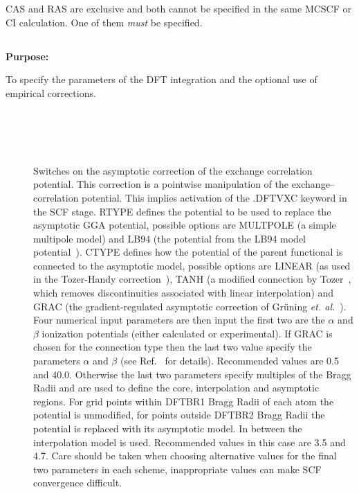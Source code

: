 \noindent
CAS and RAS are exclusive and
both cannot be specified in the same
MCSCF or CI
calculation. One of them {\em must} be specified.

\pagebreak[3]
\subsection{\label{ref-dftinp}}

{\bf Purpose:}

To specify the parameters of the DFT integration and the optional use of empirical corrections.

\begin{description}

\item[] \ \\
   \\
   \\
   \\
  Switches on the asymptotic correction of the exchange correlation potential. This correction is a pointwise manipulation of the 
  exchange--correlation potential. This implies activation of the .DFTVXC keyword in the SCF stage. RTYPE defines the
  potential to be used to replace the asymptotic GGA potential, possible options are MULTPOLE (a simple multipole model)
  and LB94 (the potential from the LB94 model potential~\cite{dft:lb94}). CTYPE defines how the potential of the parent
  functional is connected to the asymptotic model, possible options are LINEAR (as used in the Tozer-Handy correction~\cite{dft:th}), 
  TANH (a modified connection by Tozer~\cite{dft:tanh}, which removes discontinuities associated with linear interpolation) and 
  GRAC (the gradient-regulated asymptotic correction of Gr\"uning \emph{et. al.}~\cite{dft:grac}).  \\
  Four numerical input parameters are then input
  the first two are the $\alpha$ and $\beta$ ionization potentials (either calculated or experimental). If GRAC is chosen for the 
  connection type then the last two value specify the parameters $\alpha$ and $\beta$ (see Ref.~\cite{dft:grac} for details). 
  Recommended values are 0.5 and 40.0. Otherwise the last two parameters specify multiples of the 
  Bragg Radii and are used to define the core, interpolation and asymptotic regions. For grid points within DFTBR1 Bragg Radii of 
  each atom the potential is unmodified, for points outside DFTBR2 Bragg Radii the potential is replaced with its asymptotic model.
  In between the interpolation model is used. Recommended values in this case are 3.5 and 4.7. Care should be taken when 
  choosing alternative values for the final two parameters in each scheme, inappropriate values can make SCF convergence difficult.



\end{description}
